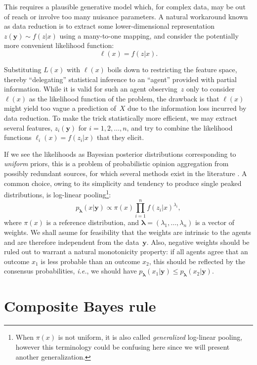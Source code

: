 \documentclass[english]{scrartcl}
\def\y{{\mathbf{y}}}
\newcommand{\blambda}{{\boldsymbol{\lambda}}}
\begin{document}
This requires a plausible generative model which, for complex data, may be out of reach or involve too many nuisance parameters. A natural workaround known as data reduction is to extract some lower-dimensional representation $z(\y)\sim f(z|x)$ using a many-to-one mapping, and consider the potentially more convenient likelihood function:
$$
\ell(x) = f(z|x)
.
$$

Substituting $L(x)$ with $\ell(x)$ boils down to restricting the feature space, thereby  ``delegating'' statistical inference to an ``agent'' provided with partial information. While it is valid for such an agent observing~$z$ only to consider $\ell(x)$ as the likelihood function of the problem, the drawback is that $\ell(x)$ might yield too vague a prediction of~$X$ due to the information loss incurred by data reduction. To make the trick statistically more efficient, we may extract several features, $z_i(\y)$ for $i=1,2,\ldots,n$, and try to combine the likelihood functions $\ell_i(x) = f(z_i|x)$ that they elicit.

If we see the likelihoods as Bayesian posterior distributions corresponding to {\em uniform} priors, this is a problem of probabilistic opinion aggregation from possibly redundant sources, for which several methods exist in the literature \cite{Tarantola-82,Genest-86,Garg-04,Allard-12}. A common choice, owing to its simplicity and tendency to produce single peaked distributions, is log-linear pooling\footnote{When $\pi(x)$ is not uniform, it is also called {\em generalized} log-linear pooling, however this terminology could be confusing here since we will present another generalization.}:
\begin{equation}
\label{eq:log_pool}
p_\blambda(x|\y) \propto \pi(x) \prod_{i=1}^n f(z_i|x)^{\lambda_i},
\end{equation} 
where $\pi(x)$ is a reference distribution, and $\blambda=(\lambda_1,\ldots,\lambda_n)$ is a vector of weights. We shall asume for feasibility that the weights are intrinsic to the agents and are therefore independent from the data~$\y$. Also, negative weights should be ruled out to warrant a natural monotonicity property: if all agents agree that an outcome $x_1$ is less probable than an outcome $x_2$, this should be reflected by the consensus probabilities, {\em i.e.}, we should have $p_\blambda(x_1|\y)\leq p_\blambda(x_2|\y)$. 


\section{Composite Bayes rule}
\label{sec:bayes_rule}
\end{document}
